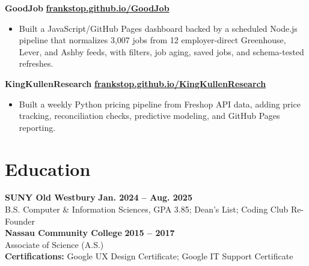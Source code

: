 \documentclass[10pt,letterpaper]{article}
\begin{document}
\textbf{GoodJob} \hfill \href{https://frankstop.github.io/GoodJob/}{\textbf{frankstop.github.io/GoodJob}}
\begin{itemize}
  \item Built a JavaScript/GitHub Pages dashboard backed by a scheduled Node.js pipeline that normalizes 3,007 jobs from 12 employer-direct Greenhouse, Lever, and Ashby feeds, with filters, job aging, saved jobs, and schema-tested refreshes.
\end{itemize}

\textbf{KingKullenResearch} \hfill \href{https://frankstop.github.io/KingKullenResearch/}{\textbf{frankstop.github.io/KingKullenResearch}}
\begin{itemize}
  \item Built a weekly Python pricing pipeline from Freshop API data, adding price tracking, reconciliation checks, predictive modeling, and GitHub Pages reporting.
\end{itemize}

\section*{Education}
\textbf{SUNY Old Westbury} \hfill \textbf{Jan. 2024 -- Aug. 2025}\\
B.S. Computer \& Information Sciences, GPA 3.85; Dean's List; Coding Club Re-Founder\\
\textbf{Nassau Community College} \hfill \textbf{2015 -- 2017}\\
Associate of Science (A.S.)\\
\textbf{Certifications:} Google UX Design Certificate; Google IT Support Certificate
\end{document}
